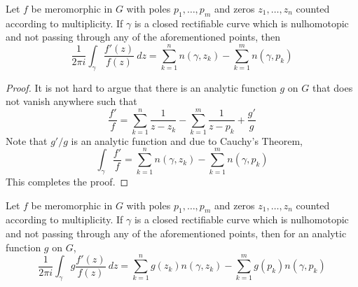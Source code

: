 \begin{theorem}
    Let $f$ be meromorphic in $G$ with poles $p_1,\ldots,p_m$ and zeros $z_1,\ldots,z_n$ counted according to multiplicity. If $\gamma$ is a closed rectifiable curve which is nulhomotopic and not passing through any of the aforementioned points, then 
    \begin{equation*}
        \frac{1}{2\pi i}\int_\gamma\frac{f'(z)}{f(z)}~dz = \sum_{k = 1}^n n(\gamma,z_k) - \sum_{k = 1}^m n(\gamma,p_k)
    \end{equation*}
\end{theorem}
\begin{proof}
    It is not hard to argue that there is an analytic function $g$ on $G$ that does not vanish anywhere such that 
    \begin{equation*}
        \frac{f'}{f} = \sum_{k = 1}^n\frac{1}{z - z_k} - \sum_{k = 1}^m\frac{1}{z - p_k} + \frac{g'}{g}
    \end{equation*}
    Note that $g'/g$ is an analytic function and due to Cauchy's Theorem, 
    \begin{equation*}
        \int_\gamma\frac{f'}{f} = \sum_{k = 1}^nn(\gamma,z_k) - \sum_{k = 1}^mn(\gamma,p_k)
    \end{equation*}
    This completes the proof.
\end{proof}

\begin{corollary}
    Let $f$ be meromorphic in $G$ with poles $p_1,\ldots,p_m$ and zeros $z_1,\ldots,z_n$ counted according to multiplicity. If $\gamma$ is a closed rectifiable curve which is nulhomotopic and not passing through any of the aforementioned points, then for an analytic function $g$ on $G$, 
    \begin{equation*}
        \frac{1}{2\pi i}\int_\gamma g\frac{f'(z)}{f(z)}~dz = \sum_{k = 1}^n g(z_k)n(\gamma,z_k) - \sum_{k = 1}^m g(p_k)n(\gamma,p_k)
    \end{equation*}
\end{corollary}

